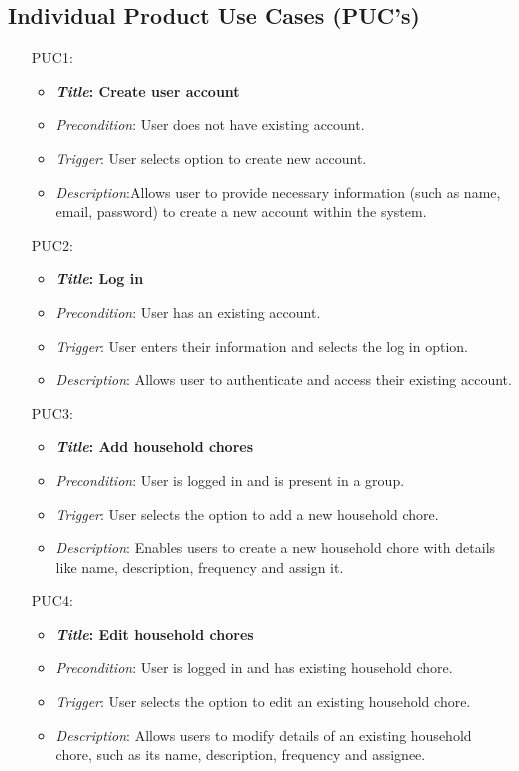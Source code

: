 \documentclass[12pt]{article}
\begin{document}
\subsection{Individual Product Use Cases (PUC's)}
\begin{itemize}
    \item[PUC1:]
        \begin{itemize}
            \item \textbf{\textit{Title}: Create user account}
            \item \textit{Precondition}: User does not have existing account.
            \item \textit{Trigger}: User selects option to create new account.
            \item \textit{Description}:Allows user to provide necessary information (such as name, email, password) to create a new account within the system.
    \end{itemize}

    \item[PUC2:]
        \begin{itemize}
            \item \textbf{\textit{Title}: Log in}
            \item \textit{Precondition}: User has an existing account.
            \item \textit{Trigger}: User enters their information and selects the log in option.
            \item \textit{Description}: Allows user to authenticate and access their existing account.
    \end{itemize}

    \item[PUC3:]
        \begin{itemize}
            \item \textbf{\textit{Title}: Add household chores}
            \item \textit{Precondition}: User is logged in and is present in a group.
            \item \textit{Trigger}: User selects the option to add a new household chore.
            \item \textit{Description}: Enables users to create a new household chore with details like name, description, frequency and assign it.
    \end{itemize}

    \item[PUC4:]
        \begin{itemize}
            \item \textbf{\textit{Title}: Edit household chores}
            \item \textit{Precondition}: User is logged in and has existing household chore.
            \item \textit{Trigger}: User selects the option to edit an existing household chore.
            \item \textit{Description}: Allows users to modify details of an existing household chore, such as its name, description, frequency and assignee.
    \end{itemize}


\end{itemize}
\end{document}
